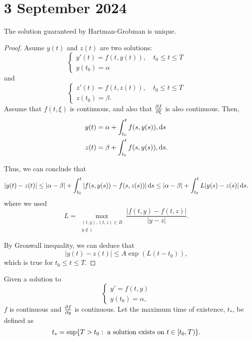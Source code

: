 \documentclass{article}
\begin{document}
\section*{3 September 2024}

\begin{theorem}{}
    The solution guaranteed by Hartman-Grobman is unique.
\end{theorem}

\begin{proof}
    Asume $y(t)$ and $z(t)$ are two solutions:
        \[
            \begin{cases}
                y'(t) = f(t, y(t)), \quad t_0 \leq t \leq T \\
                y(t_0) = \alpha
            \end{cases}
        \]
    and 
        \[
            \begin{cases}
                z'(t) = f(t, z(t)), \quad t_0 \leq t \leq T \\
                z(t_0) = \beta.
            \end{cases}
        \]
    Assume that $f(t, \xi)$ is continuous, and also that $\pdv{f}{\xi}$ is also continuous. Then, 
    \begin{align*}
        y(t) &= \alpha + \int_{t_0}^t f(s, y(s)), \text{d}s \\
        z(t) &= \beta + \int_{t_0}^t f(s, y(s)), \text{d}s.
    \end{align*}

    Thus, we can conclude that 
        \[
            |y(t) - z(t) | \leq |\alpha - \beta| + \int_{t_0}^t |f(s, y(s)) - f(s, z(s)) | \, \text{d}s \leq |\alpha - \beta| + \int_{t_0}^t L|y(s) - z(s) | \, \text{d}s.
        \]
    where we used 
        \[
            L = \max_{\substack{(t, y), (t, z) \in B \\ y \notin z}} \frac{|f(t, y) - f(t, z)|}{|y - z|}.
        \]

    By Gronwall inequality, we can deduce that 
        \[
            |y(t) - z(t)| \leq A \exp(L(t - t_0)),
        \]
    which is true for $t_0 \leq t \leq T$. 
\end{proof}

Given a solution to 
    \[
        \begin{cases*}
            y' = f(t, y) \\
            y(t_0) = \alpha,
        \end{cases*}
    \]
$f$ is continuous and $\pdv{f}{y}$ is continuous. Let the maximum time of existence, $t_*$, be defined as 
    \[
        t_* = \sup \{T > t_0 : \text{ a solution exists on } t \in [t_0, T) \}.
    \]
\end{document}
